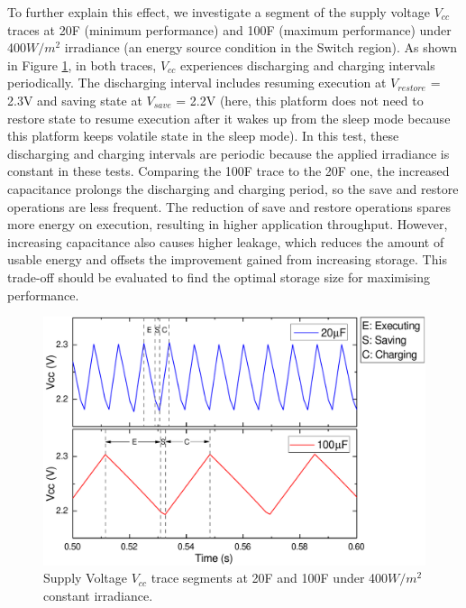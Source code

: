 To further explain this effect, we investigate a segment of the supply voltage $V_{cc}$ traces at 20\textmu F (minimum performance) and 100\textmu F (maximum performance) under 400$W/m^2$ irradiance (an energy source condition in the Switch region). As shown in Figure \ref{Figure:Vcctrace}, in both traces, $V_{cc}$ experiences discharging and charging intervals periodically. The discharging interval includes resuming execution at $V_{restore}$ = 2.3V and saving state at $V_{save}$ = 2.2V (here, this platform does not need to restore state to resume execution after it wakes up from the sleep mode because this platform keeps volatile state in the sleep mode). In this test, these discharging and charging intervals are periodic because the applied irradiance is constant in these tests. Comparing the 100\textmu F trace to the 20\textmu F one, the increased capacitance prolongs the discharging and charging period, so the save and restore operations are less frequent. The reduction of save and restore operations spares more energy on execution, resulting in higher application throughput. However, increasing capacitance also causes higher leakage, which reduces the amount of usable energy and offsets the improvement gained from increasing storage. This trade-off should be evaluated to find the optimal storage size for maximising performance. 

\begin{figure}[H]
    \centering
    \includegraphics[width=13cm]{figure/work1/Vcctrace05-06}
    \caption{Supply Voltage $V_{cc}$ trace segments at 20\textmu F and 100\textmu F under 400$W/m^2$ constant irradiance.}
    \label{Figure:Vcctrace}
\end{figure}

